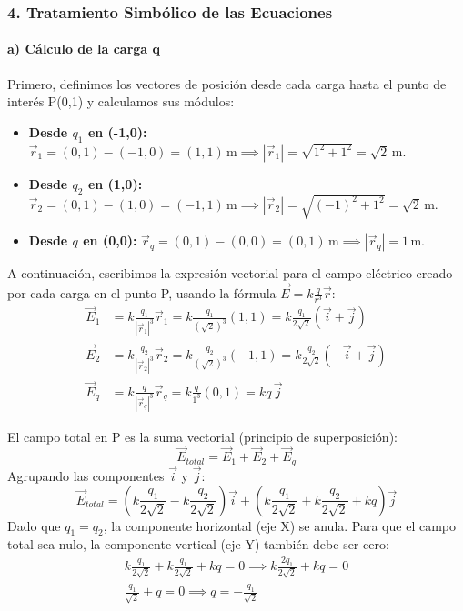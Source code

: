 \subsubsection*{4. Tratamiento Simbólico de las Ecuaciones}
\paragraph*{a) Cálculo de la carga q}
Primero, definimos los vectores de posición desde cada carga hasta el punto de interés P(0,1) y calculamos sus módulos:
\begin{itemize}
    \item \textbf{Desde $q_1$ en (-1,0):} $\vec{r}_1 = (0,1) - (-1,0) = (1,1) \, \text{m} \implies |\vec{r}_1| = \sqrt{1^2+1^2} = \sqrt{2} \, \text{m}$.
    \item \textbf{Desde $q_2$ en (1,0):} $\vec{r}_2 = (0,1) - (1,0) = (-1,1) \, \text{m} \implies |\vec{r}_2| = \sqrt{(-1)^2+1^2} = \sqrt{2} \, \text{m}$.
    \item \textbf{Desde $q$ en (0,0):} $\vec{r}_q = (0,1) - (0,0) = (0,1) \, \text{m} \implies |\vec{r}_q| = 1 \, \text{m}$.
\end{itemize}

\medskip
A continuación, escribimos la expresión vectorial para el campo eléctrico creado por cada carga en el punto P, usando la fórmula $\vec{E} = k \frac{q}{r^3}\vec{r}$:
\begin{align*}
    \vec{E}_1 &= k \frac{q_1}{|\vec{r}_1|^3} \vec{r}_1 = k \frac{q_1}{(\sqrt{2})^3} (1,1) = k \frac{q_1}{2\sqrt{2}} (\vec{i} + \vec{j}) \\
    \vec{E}_2 &= k \frac{q_2}{|\vec{r}_2|^3} \vec{r}_2 = k \frac{q_2}{(\sqrt{2})^3} (-1,1) = k \frac{q_2}{2\sqrt{2}} (-\vec{i} + \vec{j}) \\
    \vec{E}_q &= k \frac{q}{|\vec{r}_q|^3} \vec{r}_q = k \frac{q}{1^3} (0,1) = k q \, \vec{j}
\end{align*}

\medskip
El campo total en P es la suma vectorial (principio de superposición):
$$ \vec{E}_{total} = \vec{E}_1 + \vec{E}_2 + \vec{E}_q $$
Agrupando las componentes $\vec{i}$ y $\vec{j}$:
$$ \vec{E}_{total} = \left( k \frac{q_1}{2\sqrt{2}} - k \frac{q_2}{2\sqrt{2}} \right) \vec{i} + \left( k \frac{q_1}{2\sqrt{2}} + k \frac{q_2}{2\sqrt{2}} + kq \right) \vec{j} $$
Dado que $q_1=q_2$, la componente horizontal (eje X) se anula. Para que el campo total sea nulo, la componente vertical (eje Y) también debe ser cero:
\begin{gather}
    k \frac{q_1}{2\sqrt{2}} + k \frac{q_1}{2\sqrt{2}} + kq = 0 \implies k \frac{2q_1}{2\sqrt{2}} + kq = 0 \nonumber \\[8pt]
    \frac{q_1}{\sqrt{2}} + q = 0 \implies q = -\frac{q_1}{\sqrt{2}}
\end{gather}
